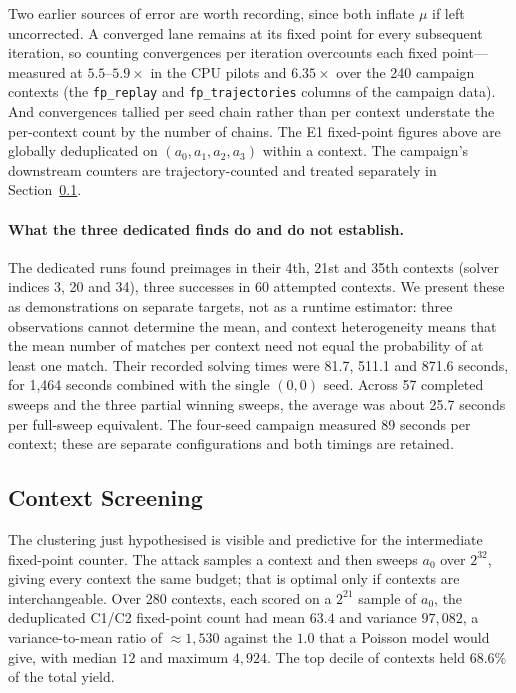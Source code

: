 \documentclass[11pt,a4paper]{article}
\begin{document}
Two earlier sources of error are worth recording, since both inflate
$\mu$ if left uncorrected.  A converged lane remains at its fixed point for
every subsequent iteration, so counting convergences per iteration overcounts
each fixed point---measured at $5.5$--$5.9\times$ in the CPU pilots and $6.35\times$ over the 240 campaign contexts (the \texttt{fp\_replay} and \texttt{fp\_trajectories} columns of the campaign data).  And
convergences tallied per seed chain rather than per context understate the
per-context count by the number of chains.  The E1 fixed-point figures above
are globally deduplicated on $(a_0,a_1,a_2,a_3)$ within a context.  The
campaign's downstream counters are trajectory-counted and treated separately
in Section~\ref{sec:screening}.

\paragraph{What the three dedicated finds do and do not establish.}
The dedicated runs found preimages in their 4th, 21st and 35th contexts
(solver indices 3, 20 and 34), three successes in 60 attempted contexts.  We
present these as demonstrations on separate targets, not as a runtime
estimator: three observations cannot determine the mean, and context
heterogeneity means that the mean number of matches per context need not equal
the probability of at least one match.  Their recorded solving times were
81.7, 511.1 and 871.6 seconds, for 1{,}464 seconds combined with the single
$(0,0)$ seed.  Across 57 completed sweeps and the three partial winning
sweeps, the average was about 25.7 seconds per full-sweep equivalent.  The
four-seed campaign measured 89 seconds per context; these are separate
configurations and both timings are retained.

\subsection{Context Screening}
\label{sec:screening}

The clustering just hypothesised is visible and predictive for the
intermediate fixed-point counter.  The
attack samples a context and then sweeps $a_0$ over $2^{32}$, giving every
context the same budget; that is optimal only if contexts are interchangeable.
Over 280 contexts, each scored on a $2^{21}$ sample of $a_0$, the deduplicated C1/C2 fixed-point count had mean $63.4$ and variance $97{,}082$, a variance-to-mean ratio of
${\approx}1{,}530$ against the $1.0$ that a Poisson model would give, with
median $12$ and maximum $4{,}924$.  The top decile of contexts held $68.6\%$ of
the total yield.
\end{document}

